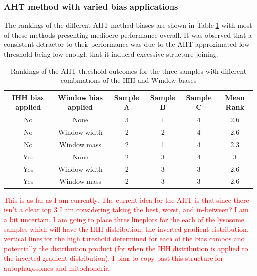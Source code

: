 \subsubsection{AHT method with varied bias applications}
The rankings of the different AHT method biases are shown in Table \ref{tab:lyso_aht} with most of these methods presenting mediocre performance overall. It was observed that a consistent detractor to their performance was due to the AHT approximated low threshold being low enough that it induced excessive structure joining. 
\begin{table}
	\centering
	\begin{tabular}{|c|c|c|c|c|c|}
		\hline
		IHH bias applied & Window bias applied & Sample A & Sample B & Sample C & Mean Rank \\
		\hline
		No & None & 3 & 1 & 4 & 2.6 \\
		\hline
		No & Window width & 2 & 2 & 4 & 2.6 \\
		\hline
		No & Window mass & 2 & 1 & 4 & 2.3 \\
		\hline
		Yes & None & 2 & 3 & 4 & 3 \\
		\hline
		Yes & Window width & 2 & 3 & 3 & 2.6 \\
		\hline
		Yes & Window mass & 2 & 3 & 3 & 2.6 \\
		\hline
	\end{tabular}
	\caption{Rankings of the AHT threshold outcomes for the three samples with different combinations of the IHH and Window biases}
	\label{tab:lyso_aht}
\end{table}
\textcolor{red}{This is as far as I am currently. The current idea for the AHT is that since there isn't a clear top 3 I am considering taking the best, worst, and in-between? I am a bit uncertain. I am going to place three lineplots for the each of the lysosome samples which will have the IHH distribution, the inverted gradient distribution, vertical lines for the high threshold determined for each of the bias combos and potentially the distribution product (for when the IHH distribution is applied to the inverted gradient distribution). I plan to copy past this structure for autophagosomes and mitochondria.}

\FloatBarrier

